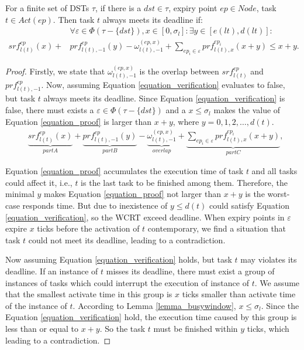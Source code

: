 \documentclass[sigconf]{acmart}
\begin{document}
\begin{theorem}\label{theorem_testtask}
  For a finite set of DSTs $\tau$, if there is a $dst\in\tau$, expiry point $ep\in Node$, task $t\in Act(ep)$. Then task $t$ always meets its deadline if:
   \begin{equation}\begin{split}
      &\forall \varepsilon\in\Phi(\tau-\{dst\}),x\in[0,\sigma_l]:\exists y\in[e(lt),d(lt)]:\\
      srf^{ep}_{l(t)}(x)+&prf^{ep}_{l(t),-1}(y)-\omega_{l(t),-1}^{(ep,x)}
      +\sum\limits_{ep_i\in \varepsilon}prf^{ep_i}_{l(t),x}(x+y)\leq x+y.
    \end{split}\label{equation_verification}\end{equation}
\end{theorem}
\begin{proof}

  Firstly, we state that $\omega_{l(t),-1}^{(ep,x)}$ is the overlap between $srf^{ep}_{l(t)}$ and $prf^{ep}_{l(t),-1}$. Now, assuming Equation \ref{equation_verification} evaluates to false, but task $t$ always meets its deadline. Since Equation \ref{equation_verification} is false, there must exists a $\varepsilon\in\Phi(\tau-\{dst\})$ and a $x\leq \sigma_l$ makes the value of Equation \ref{equation_proof} is larger than $x+y$, where $y=0,1,2,\dots,d(t)$.
  \begin{equation}\begin{split}
      &\underbrace{srf^{ep}_{l(t)}(x)}_{part A}+\underbrace{prf^{ep}_{l(t),-1}(y)}_{part B}-\underbrace{\omega^{(ep,x)}_{l(t),-1}}_{overlap}+\underbrace{\sum\limits_{ep_i\in \varepsilon}prf^{ep_i}_{l(t),x}(x+y)}_{part C},
    \end{split}\label{equation_proof}\end{equation}
  
  Equation \ref{equation_proof} accumulates the execution time of task $t$ and all tasks could affect it, i.e., $t$ is the last task to be finished among them. Therefore, the minimal $y$ makes Equation \ref{equation_proof} not larger than $x+y$ is the worst-case responds time. But due to inexistence of $y\leq d(t)$ could satisfy Equation \ref{equation_verification}, so the WCRT exceed deadline. When expiry points in $\varepsilon$ expire $x$ ticks before the activation of $t$ contemporary, we find a situation that task $t$ could not meet its deadline, leading to a contradiction. 
  
  Now assuming Equation \ref{equation_verification} holds, but task $t$ may violates its deadline. If an instance of $t$ misses its deadline, there must exist a group of instances of tasks which could interrupt the execution of instance of $t$. We assume that the smallest activate time in this group is $x$ ticks smaller than activate time of the instance of $t$. According to Lemma \ref{lemma_busywindow}, $x\leq \sigma_l$. Since the Equation \ref{equation_verification} hold, the execution time caused by this group is less than or equal to $x+y$. So the task $t$ must be finished within $y$ ticks, which leading to a contradiction.
\end{proof}
\end{document}
